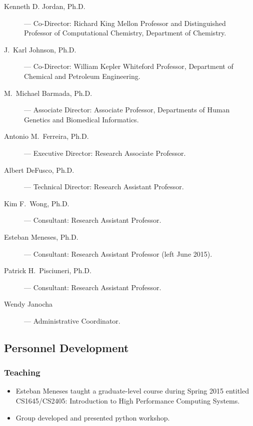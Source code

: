 \begin{description}

    \item [Kenneth D. Jordan, Ph.D.] --- Co-Director: Richard King Mellon
	  Professor and Distinguished Professor of Computational Chemistry,
          Department of Chemistry.

    \item [J.\ Karl Johnson, Ph.D.] --- Co-Director: William Kepler Whiteford
          Professor, Department of Chemical and Petroleum Engineering.

    \item [M.\ Michael Barmada, Ph.D.] --- Associate Director: Associate
	  Professor, Departments of Human Genetics and Biomedical Informatics.

    \item [Antonio M.\ Ferreira, Ph.D.] --- Executive Director: Research Associate Professor.
          

    \item [Albert DeFusco, Ph.D.] --- Technical Director: Research Assistant Professor.

    \item [Kim F.\ Wong, Ph.D.] --- Consultant: Research Assistant Professor.

    \item [Esteban Meneses, Ph.D.] --- Consultant: Research Assistant Professor (left June 2015).

    \item [Patrick H.\ Pisciuneri, Ph.D.] --- Consultant: Research Assistant Professor.

    \item [Wendy Janocha] --- Administrative Coordinator.

\end{description}


\subsection{Personnel Development}
\subsubsection{Teaching}
\begin{itemize}
    \item Esteban Meneses taught a graduate-level course during Spring 2015 entitled CS1645/CS2405: Introduction to High Performance Computing Systems.

    \item Group developed and presented python workshop.
\end{itemize}



